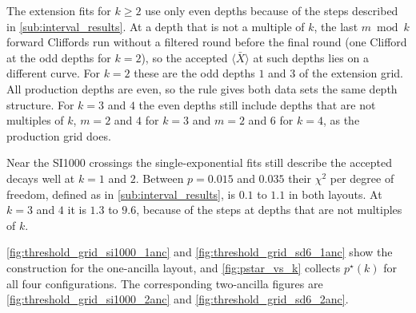 The extension fits for $k \ge 2$ use only even depths because of the steps described in \autoref{sub:interval_results}. At a depth that is not a multiple of $k$, the last $m \bmod k$ forward Cliffords run without a filtered round before the final round (one Clifford at the odd depths for $k = 2$), so the accepted $\langle \bar{X} \rangle$ at such depths lies on a different curve. For $k = 2$ these are the odd depths $1$ and $3$ of the extension grid. All production depths are even, so the rule gives both data sets the same depth structure. For $k = 3$ and $4$ the even depths still include depths that are not multiples of $k$, $m = 2$ and $4$ for $k = 3$ and $m = 2$ and $6$ for $k = 4$, as the production grid does.

Near the SI1000 crossings the single-exponential fits still describe the accepted decays well at $k = 1$ and $2$. Between $p = 0.015$ and $0.035$ their $\chi^2$ per degree of freedom, defined as in \autoref{sub:interval_results}, is $0.1$ to $1.1$ in both layouts. At $k = 3$ and $4$ it is $1.3$ to $9.6$, because of the steps at depths that are not multiples of $k$.

\autoref{fig:threshold_grid_si1000_1anc} and \autoref{fig:threshold_grid_sd6_1anc} show the construction for the one-ancilla layout, and \autoref{fig:pstar_vs_k} collects $p^\star(k)$ for all four configurations. The corresponding two-ancilla figures are \autoref{fig:threshold_grid_si1000_2anc} and \autoref{fig:threshold_grid_sd6_2anc}.

